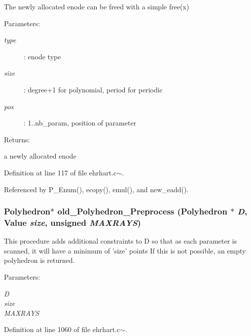 The newly allocated enode can be freed with a simple free(x)\begin{Desc}
\item[Parameters: ]\par
\begin{description}
\item[{\em 
type}]: enode type \item[{\em 
size}]: degree+1 for polynomial, period for periodic \item[{\em 
pos}]: 1..nb\_\-param, position of parameter  \end{description}
\end{Desc}
\begin{Desc}
\item[Returns: ]\par
a newly allocated enode \end{Desc}


Definition at line 117 of file ehrhart.c$\sim$.

Referenced by P\_\-Enum(), ecopy(), emul(), and new\_\-eadd().

\subsubsection{\setlength{\rightskip}{0pt plus 5cm}Polyhedron$\ast$ old\_\-Polyhedron\_\-Preprocess (Polyhedron $\ast$ {\em D}, Value {\em size}, unsigned {\em MAXRAYS})}\label{ehrhart_8c~_a22}


This procedure adds additional constraints to D so that as each parameter is scanned, it will have a minimum of 'size' points If this is not possible, an empty polyhedron is returned.

\begin{Desc}
\item[Parameters: ]\par
\begin{description}
\item[{\em 
D}]\item[{\em 
size}]\item[{\em 
MAXRAYS}]\end{description}
\end{Desc}


Definition at line 1060 of file ehrhart.c$\sim$.
